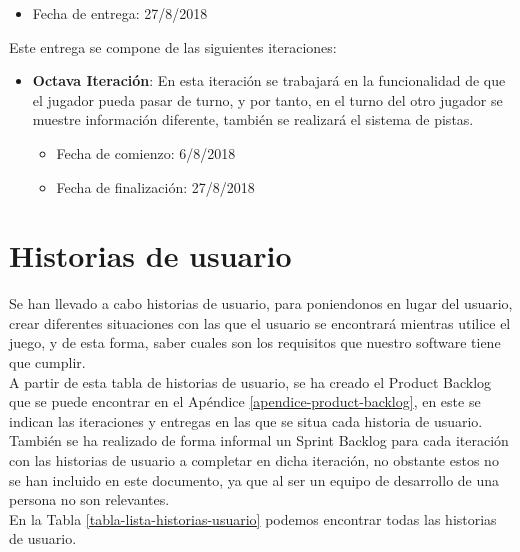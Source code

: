 \begin{itemize}
  \item Fecha de entrega: 27/8/2018
\end{itemize}

\hfill

Este entrega se compone de las siguientes iteraciones:

\begin{itemize}
  \item \textbf{Octava Iteración}:  En esta iteración se trabajará en la funcionalidad de que el jugador pueda pasar de turno, y por tanto, en el turno del otro jugador se muestre información diferente, también se realizará el sistema de pistas.

  \begin{itemize}
    \item Fecha de comienzo: 6/8/2018
    \item Fecha de finalización: 27/8/2018
  \end{itemize}
\end{itemize}


\section{Historias de usuario}
Se han llevado a cabo historias de usuario, para poniendonos en lugar del usuario, crear diferentes situaciones con las que el usuario se encontrará mientras utilice el juego, y de esta forma, saber cuales son los requisitos que nuestro software tiene que cumplir.\\

A partir de esta tabla de historias de usuario, se ha creado el Product Backlog que se puede encontrar en el Apéndice \ref{apendice-product-backlog}, en este se indican las iteraciones y entregas en las que se situa cada historia de usuario.\\

También se ha realizado de forma informal un Sprint Backlog para cada iteración con las historias de usuario a completar en dicha iteración, no obstante estos no se han incluido en este documento, ya que al ser un equipo de desarrollo de una persona no son relevantes.\\

En la Tabla \ref{tabla-lista-historias-usuario} podemos encontrar todas las historias de usuario.

